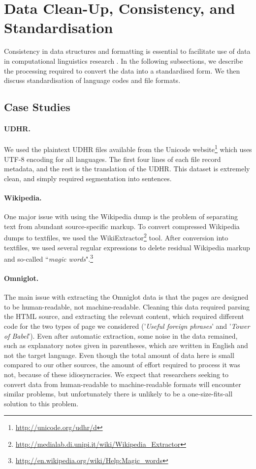 \section{Data Clean-Up, Consistency, and Standardisation} \label{sec:case_studies}
Consistency in data structures and formatting is essential to facilitate use of data in computational linguistics research \cite{palmer2010lilt}. In the following subsections, we describe the processing required to convert the data into a standardised form.  We then discuss standardisation of language codes and file formats.

\subsection{Case Studies}


\paragraph{UDHR.} We used the plaintext UDHR files available from the Unicode website\footnote{\url{http://unicode.org/udhr/d}} which uses UTF-8 encoding for all languages. The first four lines of each file record metadata, and the rest is the translation of the UDHR. This dataset is extremely clean, and simply required segmentation into sentences.


\paragraph{Wikipedia.}
One major issue with using the Wikipedia dump is the problem of separating text from abundant source-specific markup. To convert compressed Wikipedia dumps to textfiles, we used the WikiExtractor\footnote{\url{http://medialab.di.unipi.it/wiki/Wikipedia_Extractor}} tool. After conversion into textfiles, we used several regular expressions to delete residual Wikipedia markup and so-called ``\emph{magic words}".\footnote{\url{http://en.wikipedia.org/wiki/Help:Magic_words}}


\paragraph{Omniglot.}
The main issue with extracting the Omniglot data is that the pages are designed to be human-readable, not machine-readable.  Cleaning this data required parsing the HTML source, and extracting the relevant content, which required different code for the two types of page we considered ('\emph{Useful foreign phrases}' and '\emph{Tower of Babel}').  Even after automatic extraction, some noise in the data remained, such as explanatory notes given in parentheses, which are written in English and not the target language.  Even though the total amount of data here is small compared to our other sources, the amount of effort required to process it was not, because of these idiosyncracies.  We expect that researchers seeking to convert data from human-readable to machine-readable formats will encounter similar problems, but unfortunately there is unlikely to be a one-size-fits-all solution to this problem.


